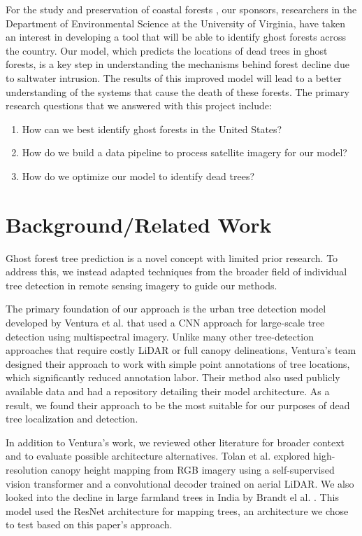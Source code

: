 \documentclass[conference]{ieeetran}
\begin{document}
For the study and preservation of coastal forests \cite{ventura2024individual}, our sponsors, researchers in the Department of Environmental Science at the University of Virginia, have taken an interest in developing a tool that will be able to identify ghost forests across the country. Our model, which predicts the locations of dead trees in ghost forests, is a key step in understanding the mechanisms behind forest decline due to saltwater intrusion. The results of this improved model will lead to a better understanding of the systems that cause the death of these forests. The primary research questions that we answered with this project include: 
\begin{enumerate}
    \item How can we best identify ghost forests in the United States?
    \item How do we build a data pipeline to process satellite imagery for our model?
    \item How do we optimize our model to identify dead trees?
\end{enumerate}

\section{Background/Related Work}

Ghost forest tree prediction is a novel concept with limited prior research. To address this, we instead adapted techniques from the broader field of individual tree detection in remote sensing imagery to guide our methods.

The primary foundation of our approach is the urban tree detection model developed by Ventura et al. that used a CNN approach for large-scale tree detection using multispectral imagery\cite{ventura2024individual}. Unlike many other tree-detection approaches that require costly LiDAR or full canopy delineations, Ventura's team designed their approach to work with simple point annotations of tree locations, which significantly reduced annotation labor. Their method also used publicly available data and had a repository detailing their model architecture. As a result, we found their approach to be the most suitable for our purposes of dead tree localization and detection. 

In addition to Ventura’s work, we reviewed other literature for broader context and to evaluate possible architecture alternatives.
Tolan et al. \cite{tolan2024canopy} explored high-resolution canopy height mapping from RGB imagery using a self-supervised vision transformer and a convolutional decoder trained on aerial LiDAR. We also looked into the decline in large farmland trees in India by Brandt el al. \cite{brandt2024farmland}. This model used the ResNet architecture for mapping trees, an architecture we chose to test based on this paper's approach.
\end{document}
